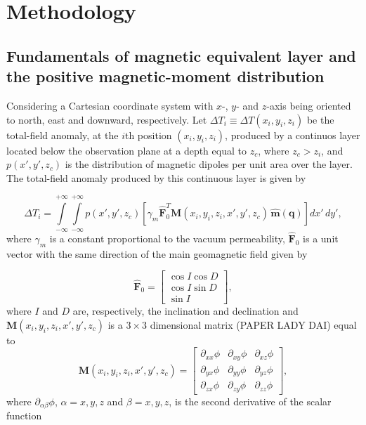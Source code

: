 \section{Methodology}
\label{sec:methodology}

\subsection{Fundamentals of magnetic equivalent layer and the positive magnetic-moment distribution}
\label{subsec:mag_eqlayer}

Considering a Cartesian coordinate system with $x$-, $y$- and $z$-axis being oriented to north, east and downward, respectively. Let $\Delta T_i \equiv \Delta T (x_i,y_i,z_i)$ be the total-field anomaly, at the $i$th position $(x_i,y_i,z_i)$, produced by a continuos layer located below the observation plane at a depth equal to $z_c$, where $z_c > z_i$, and $p(x',y',z_c)$ is the distribution of magnetic dipoles per unit area over the layer. The total-field anomaly produced by this continuous layer is given by 

\begin{equation}
\Delta T_i = \int \limits_{-\infty}^{+\infty } \int \limits_{-\infty}^{+\infty }  p(x',y',z_c)  [\gamma_m \hat{\mathbf{F}}_0^T \mathbf{M}(x_i,y_i,z_i,x',y',z_c) \,\hat{\mathbf{m}}(\mathbf{q})] dx' \,dy',
\label{eq:continuous_layer}
\end{equation}
where $\gamma_m$ is a constant proportional to the vacuum permeability, $\hat{\mathbf{F}}_0$ is a unit vector with the same direction of the main geomagnetic field given by

\begin{equation}
	\hat{\mathbf{F}}_0 =
	\left[ \begin{array}{c}
		 \cos I \cos D \\
		 \cos I \sin D \\
		 \sin I     
	\end{array} \right] ,
	\label{eq:main_field}
\end{equation}
where $I$ and $D$ are, respectively, the inclination and declination and $\mathbf{M}(x_i,y_i,z_i,x',y',z_c)$ is a $3 \times 3$ dimensional matrix (PAPER LADY DAI) equal to  
\begin{equation}
\mathbf{M}(x_i,y_i,z_i,x',y',z_c) =
\left[ \begin{array}{ccc}
\partial_{xx} \phi & \partial_{xy} \phi &\partial_{xz} \phi \\  \partial_{yx} \phi & \partial_{yy} \phi &\partial_{yz} \phi \\  \partial_{zx} \phi &\partial_{zy}\phi  & \partial_{zz} \phi    
\end{array} \right] ,
\label{eq:H}
\end{equation}
where $\partial_{\alpha \beta} \phi$, $\alpha = x, y, z$ and $\beta = x, y, z$, is the second derivative of the scalar function 

